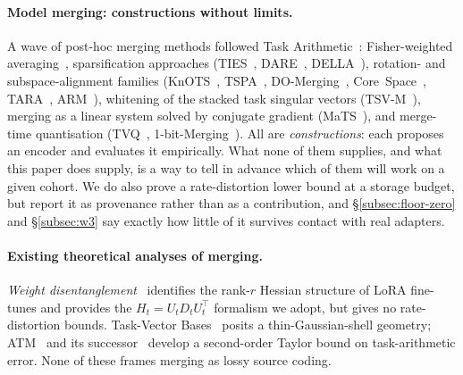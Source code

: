 \paragraph{Model merging: constructions without limits.}
A wave of post-hoc merging methods followed Task
Arithmetic~\citep{ilharco2023task}: Fisher-weighted
averaging~\citep{matena2022fisher}, sparsification approaches
(TIES~\citep{yadav2023ties}, DARE~\citep{yu2024dare},
DELLA~\citep{della2024}), rotation- and subspace-alignment families
(KnOTS~\citep{stoica2025knots}, TSPA~\citep{tspa2025},
DO-Merging~\citep{domerging2025}, Core~Space~\citep{panariello2025core},
TARA~\citep{tara2025}, ARM~\citep{arm2026streaming}), whitening of the
stacked task singular vectors (TSV-M~\citep{gargiulo2025tsv}), merging as a
linear system solved by conjugate gradient (MaTS~\citep{tam2024mats}), and
merge-time quantisation (TVQ~\citep{kim2025tvq},
1-bit-Merging~\citep{bit1merging2025}). All are \emph{constructions}:
each proposes an encoder and evaluates it empirically. What none of them
supplies, and what this paper does supply, is a way to tell in advance
which of them will work on a given cohort. We do also prove a
rate-distortion lower bound at a storage budget, but report it as
provenance rather than as a contribution, and
\S\ref{subsec:floor-zero} and \S\ref{subsec:w3} say exactly how little
of it survives contact with real adapters.

\paragraph{Existing theoretical analyses of merging.}
\emph{Weight disentanglement}~\citep{ortizjimenez2023disentanglement}
identifies the rank-$r$ Hessian structure of LoRA fine-tunes and
provides the $H_t = U_t D_t U_t^\top$ formalism we adopt, but gives no
rate-distortion bounds. Task-Vector Bases~\citep{jang2025taskvectorbases}
posits a thin-Gaussian-shell geometry; ATM~\citep{atm2024alternating}
and its successor~\citep{gradients2025taskvectorsgradients} develop a
second-order Taylor bound on task-arithmetic error. None of these frames
merging as lossy source coding.

